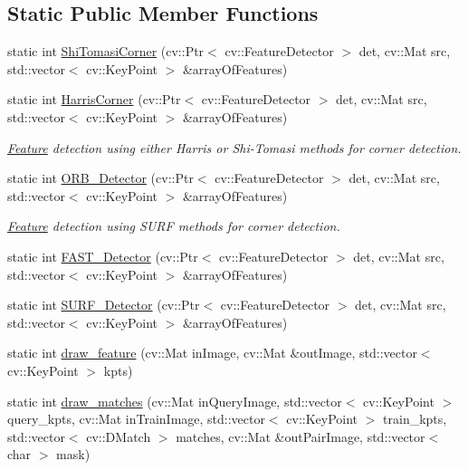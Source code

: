 \subsection*{\-Static \-Public \-Member \-Functions}
\begin{DoxyCompactItemize}
\item 
static int \hyperlink{classLRM_1_1ImageProcessor_a8a8deb80b7824c5f0946acf1ff9df73e}{\-Shi\-Tomasi\-Corner} (cv\-::\-Ptr$<$ cv\-::\-Feature\-Detector $>$ det, cv\-::\-Mat src, std\-::vector$<$ cv\-::\-Key\-Point $>$ \&array\-Of\-Features)
\item 
static int \hyperlink{classLRM_1_1ImageProcessor_ad7f3dcefc1fb5f4f012203d37208fabe}{\-Harris\-Corner} (cv\-::\-Ptr$<$ cv\-::\-Feature\-Detector $>$ det, cv\-::\-Mat src, std\-::vector$<$ cv\-::\-Key\-Point $>$ \&array\-Of\-Features)
\begin{DoxyCompactList}\small\item\em \hyperlink{classLRM_1_1Feature}{\-Feature} detection using either \-Harris or \-Shi-\/\-Tomasi methods for corner detection. \end{DoxyCompactList}\item 
static int \hyperlink{classLRM_1_1ImageProcessor_a36f20a03dd7322d66bc6bc30f93bbb0a}{\-O\-R\-B\-\_\-\-Detector} (cv\-::\-Ptr$<$ cv\-::\-Feature\-Detector $>$ det, cv\-::\-Mat src, std\-::vector$<$ cv\-::\-Key\-Point $>$ \&array\-Of\-Features)
\begin{DoxyCompactList}\small\item\em \hyperlink{classLRM_1_1Feature}{\-Feature} detection using \-S\-U\-R\-F methods for corner detection. \end{DoxyCompactList}\item 
static int \hyperlink{classLRM_1_1ImageProcessor_a98a2f239eb9376398846b8cafc3c2b43}{\-F\-A\-S\-T\-\_\-\-Detector} (cv\-::\-Ptr$<$ cv\-::\-Feature\-Detector $>$ det, cv\-::\-Mat src, std\-::vector$<$ cv\-::\-Key\-Point $>$ \&array\-Of\-Features)
\item 
static int \hyperlink{classLRM_1_1ImageProcessor_a175b94a0ed60b83d2b7687958d81193e}{\-S\-U\-R\-F\-\_\-\-Detector} (cv\-::\-Ptr$<$ cv\-::\-Feature\-Detector $>$ det, cv\-::\-Mat src, std\-::vector$<$ cv\-::\-Key\-Point $>$ \&array\-Of\-Features)
\item 
static int \hyperlink{classLRM_1_1ImageProcessor_a54467c3da8a338bac8f89c4d7f7a4dc2}{draw\-\_\-feature} (cv\-::\-Mat in\-Image, cv\-::\-Mat \&out\-Image, std\-::vector$<$ cv\-::\-Key\-Point $>$ kpts)
\item 
static int \hyperlink{classLRM_1_1ImageProcessor_a4c6bffe3c04f2580a49399bf9a285d9d}{draw\-\_\-matches} (cv\-::\-Mat in\-Query\-Image, std\-::vector$<$ cv\-::\-Key\-Point $>$ query\-\_\-kpts, cv\-::\-Mat in\-Train\-Image, std\-::vector$<$ cv\-::\-Key\-Point $>$ train\-\_\-kpts, std\-::vector$<$ cv\-::\-D\-Match $>$ matches, cv\-::\-Mat \&out\-Pair\-Image, std\-::vector$<$ char $>$ mask)

\end{DoxyCompactItemize}
